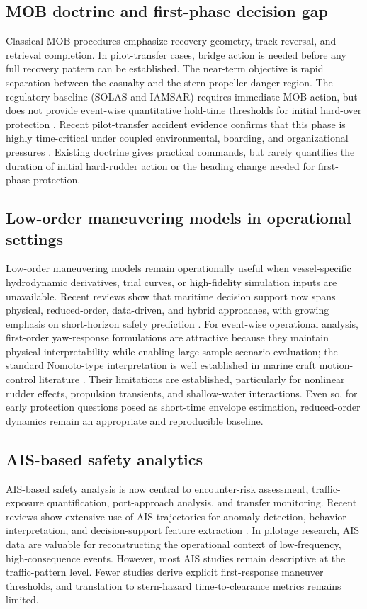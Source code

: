 \documentclass[preprint,12pt]{elsarticle}
\begin{document}
\subsection{MOB doctrine and first-phase decision gap}
Classical MOB procedures emphasize recovery geometry, track reversal, and retrieval completion. In pilot-transfer cases, bridge action is needed before any full recovery pattern can be established. The near-term objective is rapid separation between the casualty and the stern-propeller danger region. The regulatory baseline (SOLAS and IAMSAR) requires immediate MOB action, but does not provide event-wise quantitative hold-time thresholds for initial hard-over protection \cite{ref_solas,ref_iamsar}. Recent pilot-transfer accident evidence confirms that this phase is highly time-critical under coupled environmental, boarding, and organizational pressures \cite{ref_pilot_transfer_accidents}. Existing doctrine gives practical commands, but rarely quantifies the duration of initial hard-rudder action or the heading change needed for first-phase protection.

\subsection{Low-order maneuvering models in operational settings}
Low-order maneuvering models remain operationally useful when vessel-specific hydrodynamic derivatives, trial curves, or high-fidelity simulation inputs are unavailable. Recent reviews show that maritime decision support now spans physical, reduced-order, data-driven, and hybrid approaches, with growing emphasis on short-horizon safety prediction \cite{ref_ship_motion_review,ref_ship_motion_review2}. For event-wise operational analysis, first-order yaw-response formulations are attractive because they maintain physical interpretability while enabling large-sample scenario evaluation; the standard Nomoto-type interpretation is well established in marine craft motion-control literature \cite{ref_fossen}. Their limitations are established, particularly for nonlinear rudder effects, propulsion transients, and shallow-water interactions. Even so, for early protection questions posed as short-time envelope estimation, reduced-order dynamics remain an appropriate and reproducible baseline.

\subsection{AIS-based safety analytics}
AIS-based safety analysis is now central to encounter-risk assessment, traffic-exposure quantification, port-approach analysis, and transfer monitoring. Recent reviews show extensive use of AIS trajectories for anomaly detection, behavior interpretation, and decision-support feature extraction \cite{ref_ais_review}. In pilotage research, AIS data are valuable for reconstructing the operational context of low-frequency, high-consequence events. However, most AIS studies remain descriptive at the traffic-pattern level. Fewer studies derive explicit first-response maneuver thresholds, and translation to stern-hazard time-to-clearance metrics remains limited.
\end{document}
